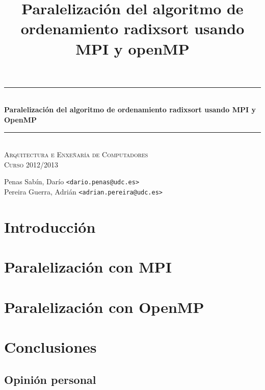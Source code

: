 \documentclass[a4paper]{article}
\title{Paralelización del algoritmo de ordenamiento radixsort usando MPI y openMP}
\newcommand{\HRule}{\rule{\linewidth}{0.5mm}}
\begin{document}
		\begin{center}

			\HRule \\[0.4cm]
			{ \huge \bfseries Paralelización del algoritmo de ordenamiento radixsort usando MPI y OpenMP}\\[0.4cm]

			\HRule \\[0cm]

			\vspace{1cm}
			\textsc{\Large Arquitectura e Enxeñaría de Computadores}\\[0.5cm]
			\textsc{\Large Curso 2012/2013}\\[0.5cm]

		\end{center}


		\vspace{2cm}

		\begin{center}
		Penas Sabín, Darío \texttt{<dario.penas@udc.es>}\\
		\vspace{0.1cm}
		Pereira Guerra, Adrián \texttt{<adrian.pereira@udc.es>}\\		
		\end{center}
		\vspace{2cm}

\vfill
\tableofcontents
\vspace{3cm}
\clearpage

\section{Introducción}
%		
\section{Paralelización con MPI}
%	
\section{Paralelización con OpenMP}
%	
\section{Conclusiones}
%	
\subsection{Opinión personal}
%	
\end{document}
